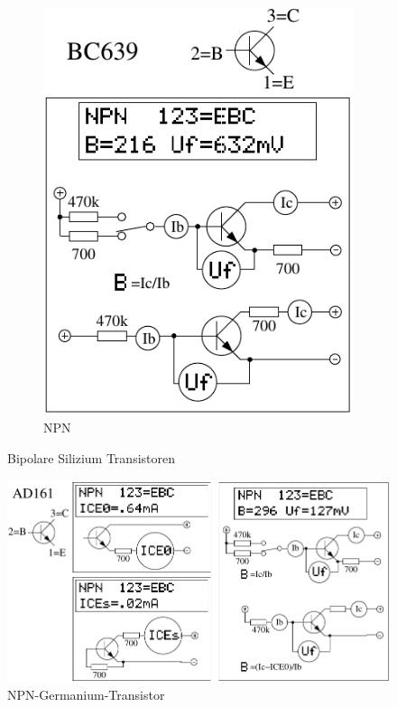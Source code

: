 \begin{figure}[H]
\begin{subfigure}[b]{.5\textwidth}
    \includegraphics[width=1.\textwidth]{../FIG/BJT_BC639.pdf}
    \caption{NPN}
    \label{fig:BJT-NPN}
  \end{subfigure}
  \caption{Bipolare Silizium Transistoren}
\end{figure}


\begin{figure}[H]
\centering
\includegraphics[width=.8\textwidth]{../FIG/BJT_AD161.pdf}
\caption{NPN-Germanium-Transistor}
\label{fig:BJT-NPN-Ge}
\end{figure}


